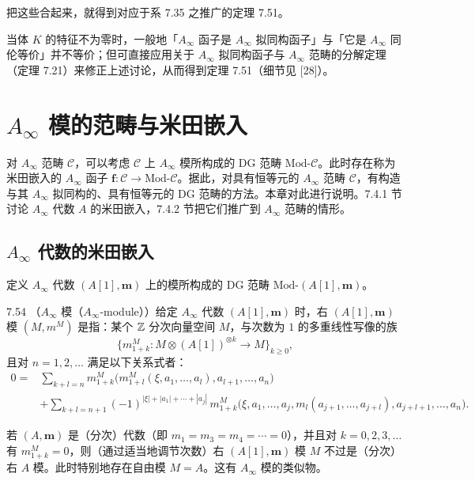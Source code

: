 把这些合起来，就得到对应于系 7.35 之推广的定理 7.51。

当体 $K$ 的特征不为零时，一般地「$A_\infty$ 函子是 $A_\infty$ 拟同构函子」与「它是 $A_\infty$ 同伦等价」并不等价；但可直接应用关于 $A_\infty$ 拟同构函子与 $A_\infty$ 范畴的分解定理（定理 7.21）来修正上述讨论，从而得到定理 7.51（细节见 [28]）。

\section{$A_\infty$ 模的范畴与米田嵌入}

对 $A_\infty$ 范畴 $\mathcal C$，可以考虑 $\mathcal C$ 上 $A_\infty$ 模所构成的 DG 范畴 $\mathrm{Mod}\text{-}\mathcal C$。此时存在称为米田嵌入的 $A_\infty$ 函子 $\mathbf f\colon\mathcal C\to\mathrm{Mod}\text{-}\mathcal C$。据此，对具有恒等元的 $A_\infty$ 范畴 $\mathcal C$，有构造与其 $A_\infty$ 拟同构的、具有恒等元的 DG 范畴的方法。本章对此进行说明。7.4.1 节讨论 $A_\infty$ 代数 $A$ 的米田嵌入，7.4.2 节把它们推广到 $A_\infty$ 范畴的情形。

\subsection{$A_\infty$ 代数的米田嵌入}

定义 $A_\infty$ 代数 $(A[1],\mathbf m)$ 上的模所构成的 DG 范畴 $\mathrm{Mod}\text{-}(A[1],\mathbf m)$。

\begin{definition}{7.54}
（$A_\infty$ 模（$A_\infty$-module））给定 $A_\infty$ 代数 $(A[1],\mathbf m)$ 时，右 $(A[1],\mathbf m)$ 模 $(M,m^{M})$ 是指：某个 $\mathbb{Z}$ 分次向量空间 $M$，与次数为 $1$ 的多重线性写像的族
\[
  \{m_{1+k}^{M}\colon M\otimes(A[1])^{\otimes k}\to M\}_{k\ge 0},
\]
且对 $n=1,2,\dots$ 满足以下关系式者：
\begin{equation}
\begin{aligned}
  0={}&\sum_{k+l=n}m_{1+k}^{M}\bigl(m_{1+l}^{M}(\xi,a_{1},\dots,a_{l}),a_{l+1},\dots,a_{n}\bigr)\\
  &+\sum_{k+l=n+1}(-1)^{|\xi|+|a_{1}|+\cdots+|a_{j}|}\,m_{1+k}^{M}\bigl(\xi,a_{1},\dots,a_{j},m_{l}(a_{j+1},\dots,a_{j+l}),a_{j+l+1},\dots,a_{n}\bigr).
\end{aligned}
\tag{7.8}
\end{equation}
\end{definition}

若 $(A,\mathbf m)$ 是（分次）代数（即 $m_{1}=m_{3}=m_{4}=\cdots=0$），并且对 $k=0,2,3,\dots$ 有 $m_{1+k}^{M}=0$，则（通过适当地调节次数）右 $(A[1],\mathbf m)$ 模 $M$ 不过是（分次）右 $A$ 模。此时特别地存在自由模 $M=A$。这有 $A_\infty$ 模的类似物。

